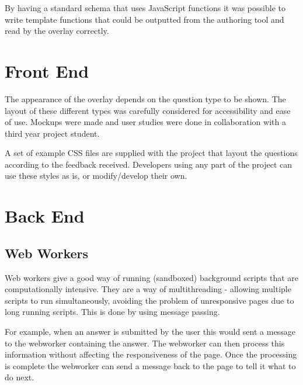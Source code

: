 By having a standard schema that uses JavaScript functions it was possible to
write template functions that could be outputted from the authoring tool and
read by the overlay correctly.

\section{Front End}
\label{Section:Front end}

The appearance of the overlay depends on the question type to be shown. The
layout of these different types was carefully considered for accessibility and
ease of use. Mockups were made and user studies were done in collaboration with
a third year project student.

A set of example \gls{CSS} files are supplied with the project that layout the
questions according to the feedback received. Developers using any part of the
project can use these styles as is, or modify/develop their own.

\section{Back End}
\label{Section:Back end}

\subsection{Web Workers}
\label{Subsection:WebWorkers}

Web workers give a good way of running (sandboxed) background scripts that are
computationally intensive. They are a way of multithreading - allowing multiple
scripts to run simultaneously, avoiding the problem of unresponsive pages due
to long running scripts. This is done by using message passing.

For example, when an answer is submitted by the user this would sent a message
to the \gls{webworker} containing the answer. The \gls{webworker} can then process this
information without affecting the responsiveness of the page. Once the
processing is complete the \gls{webworker} can send a message back to the page to
tell it what to do next.

